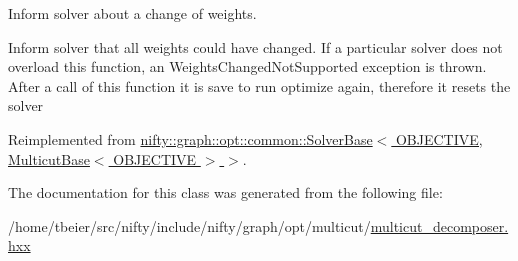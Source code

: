 Inform solver about a change of weights. 

Inform solver that all weights could have changed. If a particular solver does not overload this function, an Weights\+Changed\+Not\+Supported exception is thrown. After a call of this function it is save to run optimize again, therefore it resets the solver 

Reimplemented from \hyperlink{classnifty_1_1graph_1_1opt_1_1common_1_1SolverBase_a6a5d77ee514c4b5f44d1908c1000f0ff}{nifty\+::graph\+::opt\+::common\+::\+Solver\+Base$<$ O\+B\+J\+E\+C\+T\+I\+V\+E, Multicut\+Base$<$ O\+B\+J\+E\+C\+T\+I\+V\+E $>$ $>$}.



The documentation for this class was generated from the following file\+:\begin{DoxyCompactItemize}
\item 
/home/tbeier/src/nifty/include/nifty/graph/opt/multicut/\hyperlink{multicut__decomposer_8hxx}{multicut\+\_\+decomposer.\+hxx}\end{DoxyCompactItemize}
